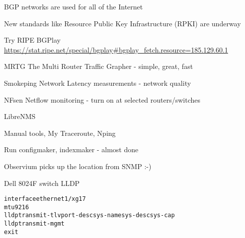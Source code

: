 \documentclass[Screen16to9,17pt]{foils}
\begin{document}

\begin{list2}
\item BGP networks are used for all of the Internet
\item New standards like Resource Public Key Infrastructure (RPKI) are underway
\item Try RIPE BGPlay \url{https://stat.ripe.net/special/bgplay#bgplay_fetch.resource=185.129.60.1}
\end{list2}




\begin{slidelist}
\item MRTG The Multi Router Traffic Grapher - simple, great, fast\\
\item Smokeping Network Latency measurements - network quality\\
\item NFsen Netflow monitoring - turn on at selected routers/switches
\item LibreNMS 
\item Manual tools, My Traceroute, Nping
\end{slidelist}



\centerline{Run configmaker, indexmaker - almost done}








\centerline{Observium picks up the location from SNMP :-)}


Dell 8024F switch LLDP


\begin{alltt}\small
interface ethernet 1/xg17
mtu 9216
lldp transmit-tlv port-desc sys-name sys-desc sys-cap
lldp transmit-mgmt
exit
\end{alltt}
\end{document}
